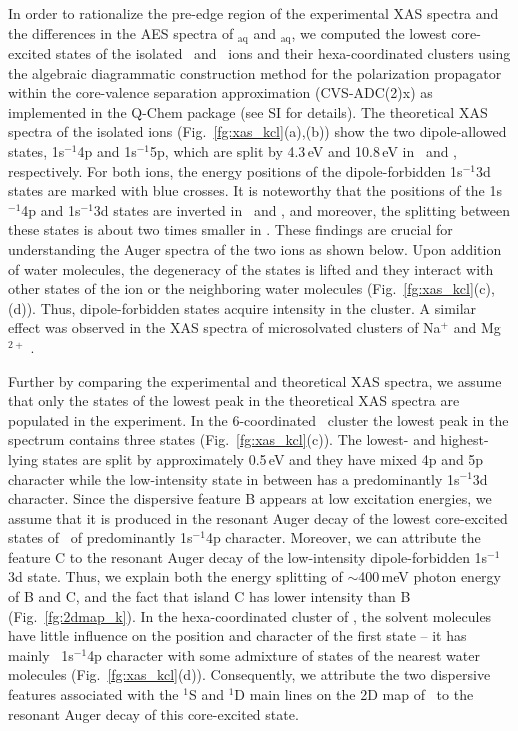 In order to rationalize the pre-edge region of the experimental XAS spectra and the differences in the AES spectra of \ki$_{\text{aq}}$ and \cli$_{\text{aq}}$, we computed the lowest core-excited states of the isolated \ki~and \cli~ions and their hexa-coordinated clusters using the algebraic diagrammatic construction method for the polarization propagator \citep{sch82:2395} within the core-valence separation approximation \citep{bar85:867,ced80:206,ced81:1038} (CVS-ADC(2)x) as implemented in the Q-Chem package \citep{Wenzel14:1900,Wenzel14:4583,Wormit14:774,QChem2015} (see SI for details). The theoretical XAS spectra of the isolated ions (Fig.\ \ref{fg:xas_kcl}(a),(b)) show the two dipole-allowed states, 1s$^{-1}$4p and 1s$^{-1}$5p, which are split by 4.3\,eV and 10.8\,eV in \ki~and \cli, respectively. For both ions, the energy positions of the dipole-forbidden 1s$^{-1}$3d states are marked with blue crosses. It is noteworthy that the positions of the 1s$^{-1}$4p and 1s$^{-1}$3d states are inverted in \ki~and \cli, and moreover, the splitting between these states is about two times smaller in \ki. These findings are crucial for understanding the Auger spectra of the two ions as shown below. Upon addition of water molecules, the degeneracy of the states is lifted and they interact with other states of the ion or the neighboring water molecules (Fig.\ \ref{fg:xas_kcl}(c),(d)). Thus, dipole-forbidden states acquire intensity in the cluster. A similar effect was observed in the XAS spectra of microsolvated clusters of Na$^{+}$ and Mg$^{2+}$ \citep{miteva16:16671}. %


Further by comparing the experimental and theoretical XAS spectra, we assume that only the states of the lowest peak in the theoretical XAS spectra are populated in the experiment. In the 6-coordinated \ki~cluster the lowest peak in the spectrum contains three states (Fig.\ \ref{fg:xas_kcl}(c)). The lowest- and highest-lying states are split by approximately 0.5\,eV and they have mixed 4p and 5p character while the low-intensity state in between has a predominantly 1s$^{-1}$3d character. Since the dispersive feature B appears at low excitation energies, we assume that it is produced in the resonant Auger decay of the lowest core-excited states of \ki~of predominantly 1s$^{-1}$4p character. Moreover, we can attribute the feature C to the resonant Auger decay of the low-intensity dipole-forbidden 1s$^{-1}$3d state. Thus, we explain both the energy splitting of $\sim$400\,meV photon energy of B and C, and the fact that island C has lower intensity than B (Fig.\ \ref{fg:2dmap_k}). In the hexa-coordinated cluster of \cli, the solvent molecules have little influence on the position and character of the first state -- it has mainly \cli~1s$^{-1}$4p character with some admixture of states of the nearest water molecules (Fig.\ \ref{fg:xas_kcl}(d)). Consequently, we attribute the two dispersive features associated with the $^1$S and $^1$D main lines on the 2D map of \cli~to the resonant Auger decay of this core-excited state. %


